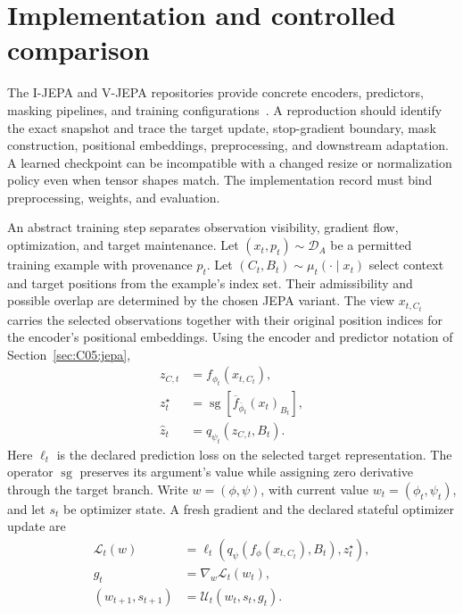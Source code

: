 \section{Implementation and controlled comparison}
\label{sec:C05:implementation}
The I-JEPA and V-JEPA repositories provide concrete encoders, predictors, masking pipelines, and training configurations~\cite{repo_ijepa,repo_vjepa}. A reproduction should identify the exact snapshot and trace the target update, stop-gradient boundary, mask construction, positional embeddings, preprocessing, and downstream adaptation. A learned checkpoint can be incompatible with a changed resize or normalization policy even when tensor shapes match. The implementation record must bind preprocessing, weights, and evaluation.

An abstract training step separates observation visibility, gradient flow, optimization, and target maintenance. Let $(x_t,p_t)\sim\mathcal D_A$ be a permitted training example with provenance $p_t$. Let $(C_t,B_t)\sim\mu_t(\cdot\mid x_t)$ select context and target positions from the example's index set. Their admissibility and possible overlap are determined by the chosen JEPA variant. The view $x_{t,C_t}$ carries the selected observations together with their original position indices for the encoder's positional embeddings. Using the encoder and predictor notation of Section~\ref{sec:C05:jepa},
\begin{equation}
\begin{aligned}
 z_{C,t}&=f_{\phi_t}(x_{t,C_t}),\\
 z_t^\star&=\operatorname{sg}\!\left[
 \overline f_{\bar\phi_t}(x_t)_{B_t}\right],\\
 \widehat z_t&=q_{\psi_t}(z_{C,t},B_t).
\end{aligned}
\label{eq:C05:trainingvisibility}
\end{equation}
Here $\ell_t$ is the declared prediction loss on the selected target representation. The operator $\operatorname{sg}$ preserves its argument's value while assigning zero derivative through the target branch. Write $w=(\phi,\psi)$, with current value $w_t=(\phi_t,\psi_t)$, and let $s_t$ be optimizer state. A fresh gradient and the declared stateful optimizer update are
\begin{equation}
\begin{aligned}
 \mathcal L_t(w)&=\ell_t\!\left(
 q_\psi(f_\phi(x_{t,C_t}),B_t),z_t^\star\right),\\
 g_t&=\nabla_w\mathcal L_t(w_t),\\
 (w_{t+1},s_{t+1})&=\mathcal U_t(w_t,s_t,g_t).
\end{aligned}
\label{eq:C05:trainingupdate}
\end{equation}
